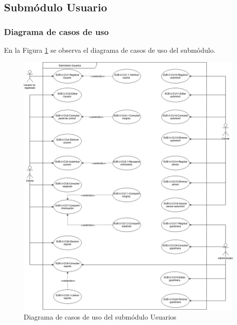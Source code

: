 \subsection{Submódulo Usuario}
\subsubsection{Diagrama de casos de uso}
En la Figura \ref{fig:dcu-usuarios} se observa el diagrama de casos de uso del submódulo.
\begin{figure}[H]
	\centering
	\includegraphics[scale=.4]{Capitulo4/software/submodulos/usuarios/images/dcu}
	\caption{Diagrama de casos de uso del submódulo Usuarios}
	\label{fig:dcu-usuarios}
\end{figure}
\newpage




